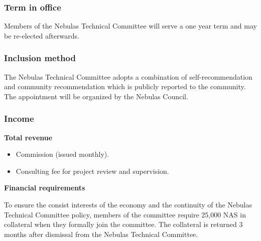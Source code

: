 \subsubsection{Term in office}

Members of the Nebulas Technical Committee will serve a one year term and may be re-elected afterwards.

\subsubsection{Inclusion method}

The Nebulas Technical Committee adopts a combination of self-recommendation and community recommendation which is publicly reported to the community. The appointment will be organized by the Nebulas Council.

\subsubsection{Income}

\textbf{Total revenue}

\begin{itemize}
	\item Commission (issued monthly).
	\item Consulting fee for project review and supervision.
\end{itemize}

\vspace{2em}

\textbf{Financial requirements}

To ensure the consist interests of the economy and the continuity of the Nebulas Technical Committee policy, members of the committee require 25,000 NAS in collateral when they formally join the committee. The collateral is returned 3 months after dismissal from the Nebulas Technical Committee.